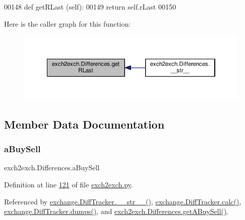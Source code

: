 \begin{DoxyCode}
00148     \textcolor{keyword}{def }getRLast (self):
00149         \textcolor{keywordflow}{return} self.rLast
00150         
\end{DoxyCode}
Here is the caller graph for this function\+:
\nopagebreak
\begin{figure}[H]
\begin{center}
\leavevmode
\includegraphics[width=350pt]{classexch2exch_1_1_differences_ac4f1f695ff394d65cfb51ea55dc67fa5_icgraph}
\end{center}
\end{figure}


\subsection{Member Data Documentation}
\mbox{\label{classexch2exch_1_1_differences_aac9b76364eb6e0ee83417c0128aaa001}} 
\subsubsection{\texorpdfstring{a\+Buy\+Sell}{aBuySell}}
{\footnotesize\ttfamily exch2exch.\+Differences.\+a\+Buy\+Sell}



Definition at line \hyperlink{exch2exch_8py_source_l00121}{121} of file \hyperlink{exch2exch_8py_source}{exch2exch.\+py}.



Referenced by \hyperlink{exchange_8py_source_l00336}{exchange.\+Diff\+Tracker.\+\_\+\+\_\+str\+\_\+\+\_\+()}, \hyperlink{exchange_8py_source_l00309}{exchange.\+Diff\+Tracker.\+calc()}, \hyperlink{exchange_8py_source_l00385}{exchange.\+Diff\+Tracker.\+dumps()}, and \hyperlink{exch2exch_8py_source_l00139}{exch2exch.\+Differences.\+get\+A\+Buy\+Sell()}.

\mbox{\label{classexch2exch_1_1_differences_abd4dd96bd69025147d0bdb33d9c69345}} 
